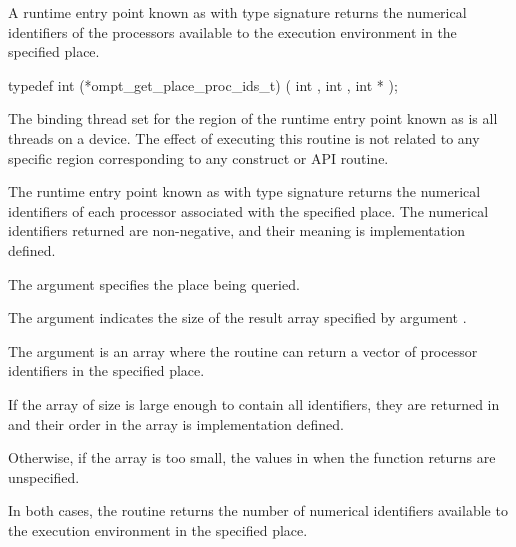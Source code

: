 \label{sec:ompt_get_place_proc_ids_t}
\label{sec:ompt_get_place_proc_ids}

\summary

A runtime entry point known as
 with type signature
returns the numerical identifiers of the processors
available to the execution environment in the specified place.

\format

\begin{ccppspecific}
\begin{omptInquiry}
typedef int (*ompt_get_place_proc_ids_t) (
  int ,
  int ,
  int *
);
\end{omptInquiry}
\end{ccppspecific}


\binding

The binding thread set for the region
of the runtime entry point known as 
is all threads on a device. The effect of executing this
routine is not related to any specific region corresponding
to any construct or API routine.

\descr

The runtime entry point known as
 with type signature
 returns
the numerical identifiers of each processor
associated with the specified place.
The numerical identifiers returned are non-negative, and
their meaning is implementation defined.

\argdesc

The argument  specifies the place being
queried.

The argument  indicates the size of the result
array specified by argument .

The argument  is an array where the routine can return
a vector of processor identifiers in the specified place.

\effect

If the array  of size  is large enough to
contain all identifiers, they are returned in  and
their order in the array is implementation defined.

Otherwise, if the  array is too small, the values in  when the function returns are unspecified.

In both cases, the routine returns the number of numerical identifiers
available to the execution environment in the specified place.

